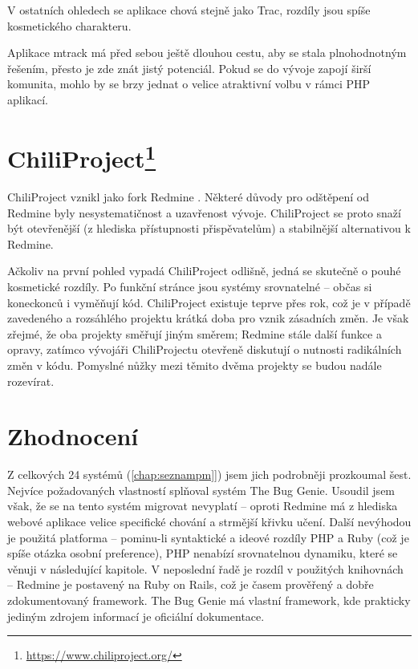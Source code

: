 \documentclass[thesis=B,czech]{FITthesis}[2012/05/02]
\begin{document}
V ostatních ohledech se aplikace chová stejně jako Trac, rozdíly jsou
spíše kosmetického charakteru.

Aplikace mtrack má před sebou ještě dlouhou cestu, aby se stala plnohodnotným
řešením, přesto je zde znát jistý potenciál. Pokud se do vývoje zapojí
širší komunita, mohlo by se brzy jednat o velice atraktivní volbu v
rámci PHP aplikací.

\section[ChiliProject]{ChiliProject\footnote{\url{https://www.chiliproject.org/}}}

ChiliProject vznikl jako \gls{fork} Redmine
\citep{ChiliProjectWhyFork}. Některé důvody pro odštěpení od Redmine
byly nesystematičnost a uzavřenost vývoje. ChiliProject se proto snaží
být otevřenější (z hlediska přístupnosti přispěvatelům) a stabilnější
alternativou k Redmine.

Ačkoliv na první pohled vypadá ChiliProject odlišně, jedná se skutečně
o pouhé kosmetické rozdíly. Po funkční stránce jsou systémy srovnatelné -- občas
si koneckonců i vyměňují kód. ChiliProject existuje teprve přes
rok, což je v případě zavedeného a rozsáhlého projektu krátká doba pro
vznik zásadních změn. Je však zřejmé, že oba projekty směřují jiným
směrem; Redmine stále  další funkce a opravy, zatímco
vývojáři ChiliProjectu otevřeně diskutují o nutnosti radikálních změn
v kódu. Pomyslné nůžky mezi těmito dvěma projekty se budou nadále
rozevírat.

\section{Zhodnocení}

Z celkových 24 systémů (\autoref{chap:seznampm}]) jsem jich podrobněji
prozkoumal šest. Nejvíce požadovaných vlastností splňoval systém The Bug
Genie. Usoudil jsem však, že se na tento systém migrovat nevyplatí --
oproti Redmine má z hlediska webové aplikace velice specifické chování a
strmější křivku učení. Další nevýhodou je použitá platforma -- pominu-li
syntaktické a ideové rozdíly PHP a Ruby (což je spíše otázka osobní
preference), PHP nenabízí srovnatelnou dynamiku, které se věnuji
v následující kapitole. V neposlední řadě je
rozdíl v použitých knihovnách -- Redmine je postavený na Ruby on Rails,
což je časem prověřený a dobře zdokumentovaný framework. The Bug Genie
má vlastní framework, kde prakticky jediným zdrojem informací je
oficiální dokumentace.
\end{document}
